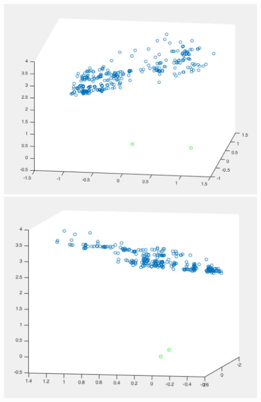\documentclass[11pt]{article}
\begin{document}
\includegraphics[scale=0.40]{library1.png} \includegraphics[scale=0.40]{library2.png}\\
\end{document}
